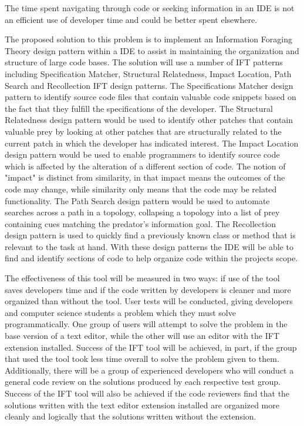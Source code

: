 \documentclass[letterpaper,10pt,titlepage,draftclsnofoot,onecolumn] {IEEEtran}
\begin{document}
\bigskip
The time spent navigating through code or seeking information in an IDE is not an efficient use of developer time and could be better spent elsewhere.

\bigskip
The proposed solution to this problem is to implement an Information Foraging Theory design pattern within a IDE to assist in maintaining the organization and structure of large code bases.
The solution will use a number of IFT patterns including Specification Matcher, Structural Relatedness, Impact Location, Path Search and Recollection IFT design patterns.
The Specifications Matcher design pattern to identify source code files that contain valuable code snippets based on the fact that they fulfill the specifications of the developer. 
The Structural Relatedness design pattern would be used to identify other patches that contain valuable prey by looking at other patches that are structurally related to the current patch in which the developer has indicated interest.
The Impact Location design pattern would be used to enable programmers to identify source code which is affected by the alteration of a different section of code. 
The notion of "impact" is distinct from similarity, in that impact means the outcomes of the code may change, while similarity only means that the code may be related functionality. 
The Path Search design pattern would be used to automate searches across a path in a topology, collapsing a topology into a list of prey containing cues matching the predator's information goal. 
The Recollection design pattern is used to quickly find a previously known class or method that is relevant to the task at hand.
With these design patterns the IDE will be able to find and identify sections of code to help organize code within the projects scope.

\bigskip
The effectiveness of this tool will be measured in two ways: if use of the tool saves developers time and if the code written by developers is cleaner and more organized than without the tool. 
User tests will be conducted, giving developers and computer science students a problem which they must solve programmatically. 
One group of users will attempt to solve the problem in the base version of a text editor, while the other will use an editor with the IFT extension installed. 
Success of the IFT tool will be achieved, in part, if the group that used the tool took less time overall to solve the problem given to them. 
Additionally, there will be a group of experienced developers who will conduct a general code review on the solutions produced by each respective test group. 
Success of the IFT tool will also be achieved if the code reviewers find that the solutions written with the text editor extension installed are organized more cleanly and logically that the solutions written without the extension. 
\end{document}
